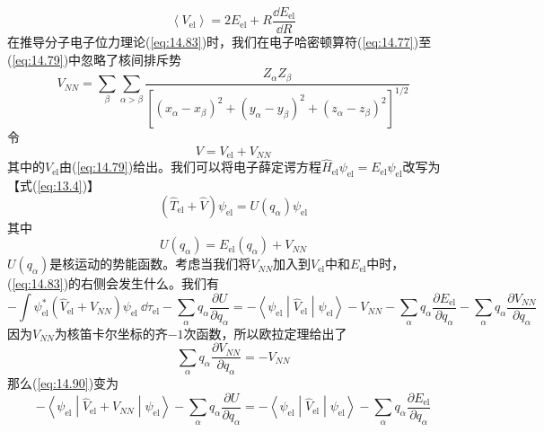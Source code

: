     \begin{equation}
        \left\langle V_{\text{el}} \right\rangle = 2E_{\text{el}} + R \frac{\dd E_{\text{el}}}{\dd R}
        \label{eq:14.88}
    \end{equation}
    在推导分子电子位力理论(\ref{eq:14.83})时，我们在电子哈密顿算符(\ref{eq:14.77})至(\ref{eq:14.79})中忽略了核间排斥势
    \begin{equation}
        V_{NN} = \sum_{\beta} \sum_{\alpha > \beta} \frac{Z_{\alpha} Z_{\beta}}{\left[\left(x_{\alpha} - x_{\beta}\right)^2 + \left(y_{\alpha} - y_{\beta}\right)^2 + \left(z_{\alpha} - z_{\beta}\right)^2\right]^{1/2}}
        \label{eq:14.89}
    \end{equation}
    令
    \begin{equation*}
        V = V_{\text{el}} + V_{NN}
    \end{equation*}
    其中的$V_{\text{el}}$由(\ref{eq:14.79})给出。我们可以将电子薛定谔方程$\hat{H}_{\text{el}} \psi_{\text{el}} = E_{\text{el}} \psi_{\text{el}}$改写为【式(\ref{eq:13.4})】
    \begin{equation*}
        \left(\hat{T}_{\text{el}} + \hat{V}\right) \psi_{\text{el}} = U \left(q_{\alpha}\right) \psi_{\text{el}}
    \end{equation*}
    其中
    \begin{equation*}
        U \left(q_{\alpha}\right) = E_{\text{el}} \left(q_{\alpha}\right) + V_{NN}
    \end{equation*}
    $U\left(q_{\alpha}\right)$是核运动的势能函数。考虑当我们将$V_{NN}$加入到$V_{\text{el}}$中和$E_{\text{el}}$中时，(\ref{eq:14.83})的右侧会发生什么。我们有
    \begin{equation}
        - \int \psi_{\text{el}}^* \left(\hat{V}_{\text{el}} + V_{NN}\right) \psi_{\text{el}}\:\dd \tau_{\text{el}} - \sum_{\alpha} q_{\alpha} \frac{\partial U}{\partial q_{\alpha}} = - \left\langle \psi_{\text{el}} \middle| \hat{V}_{\text{el}} \middle| \psi_{\text{el}} \right\rangle - V_{NN} - \sum_{\alpha} q_{\alpha} \frac{\partial E_{\text{el}}}{\partial q_{\alpha}} - \sum_{\alpha} q_{\alpha} \frac{\partial V_{NN}}{\partial q_{\alpha}}
        \label{eq:14.90}
    \end{equation}
    因为$V_{NN}$为核笛卡尔坐标的齐$-1$次函数，所以欧拉定理给出了
    \begin{equation*}
        \sum_{\alpha} q_{\alpha} \frac{\partial V_{NN}}{\partial q_{\alpha}} = -V_{NN}
    \end{equation*}
    那么(\ref{eq:14.90})变为
    \begin{equation}
        - \left\langle \psi_{\text{el}} \middle| \hat{V}_{\text{el}} + V_{NN} \middle| \psi_{\text{el}} \right\rangle - \sum_{\alpha} q_{\alpha} \frac{\partial U}{\partial q_{\alpha}} = - \left\langle \psi_{\text{el}} \middle| \hat{V}_{\text{el}} \middle| \psi_{\text{el}} \right\rangle - \sum_{\alpha} q_{\alpha} \frac{\partial E_{\text{el}}}{\partial q_{\alpha}}
        \label{eq:14.91}
    \end{equation}
